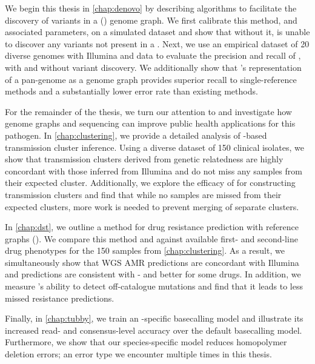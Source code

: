 We begin this thesis in \autoref{chap:denovo} by describing algorithms to facilitate the \denovo{} discovery of variants in a (\pandora{}) genome graph. We first calibrate this method, and associated parameters, on a simulated dataset and show that without it, \pandora{} is unable to discover any variants not present in a \panrg{}. Next, we use an empirical dataset of 20 diverse \ecoli{} genomes with Illumina and \ont{} data to evaluate the precision and recall of \pandora{}, with and without \denovo{} variant discovery. We additionally show that \pandora{}'s representation of a pan-genome as a genome graph provides superior recall to single-reference methods and a substantially lower \ont{} error rate than existing methods.

For the remainder of the thesis, we turn our attention to \mtb{} and investigate how genome graphs and \ont{} sequencing can improve public health applications for this pathogen. In \autoref{chap:clustering}, we provide a detailed analysis of \ont{}-based transmission cluster inference. Using a diverse dataset of 150 \mtb{} clinical isolates, we show that transmission clusters derived from \ont{} genetic relatedness are highly concordant with those inferred from Illumina and do not miss any samples from their expected cluster. Additionally, we explore the efficacy of \pandora{} for constructing transmission clusters and find that while no samples are missed from their expected clusters, more work is needed to prevent merging of separate clusters.

In \autoref{chap:dst}, we outline a method for drug resistance prediction with \pandora{} reference graphs (\drprg{}). We compare this method and \mykrobe{} against available first- and second-line drug phenotypes for the 150 samples from \autoref{chap:clustering}. As a result, we simultaneously show that \ont{} WGS AMR predictions are concordant with Illumina and \drprg{} predictions are consistent with \mykrobe{} - and better for some drugs. In addition, we measure \drprg{}'s ability to detect off-catalogue mutations and find that it leads to less missed resistance predictions.

Finally, in \autoref{chap:tubby}, we train an \mtb{}-specific \ont{} basecalling model and illustrate its increased read- and consensus-level accuracy over the default basecalling model. Furthermore, we show that our species-specific model reduces homopolymer deletion errors; an error type we encounter multiple times in this thesis.